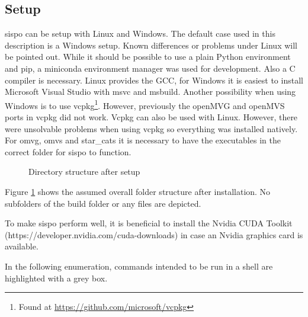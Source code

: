 \subsection{Setup}
\gls{sispo} can be setup with Linux and Windows. The default case used in this description is a Windows setup. Known differences or problems under Linux will be pointed out. While it should be possible to use a plain Python environment and pip, a miniconda environment manager was used for development. Also a C compiler is necessary. Linux provides the GCC, for Windows it is easiest to install Microsoft Visual Studio with \gls{msvc} and \gls{msbuild}. Another possibility when using Windows is to use vcpkg\footnote{Found at \url{https://github.com/microsoft/vcpkg}}. However, previously the openMVG and openMVS ports in vcpkg did not work. Vcpkg can also be used with Linux. However, there were unsolvable problems when using vcpkg so everything was installed natively.
For \gls{omvg}, \gls{omvs} and star\_cats it is necessary to have the executables in the correct folder for \gls{sispo} to function.\newline

\begin{figure}
    \caption{Directory structure after setup}
    \label{fig:dir_tree}
\end{figure}
Figure \ref{fig:dir_tree} shows the assumed overall folder structure after installation. No subfolders of the build folder or any files are depicted.

To make \gls{sispo} perform well, it is beneficial to install the Nvidia CUDA Toolkit (https://developer.nvidia.com/cuda-downloads) in case an Nvidia graphics card is available.

In the following enumeration, commands intended to be run in a shell are highlighted with a grey box.


